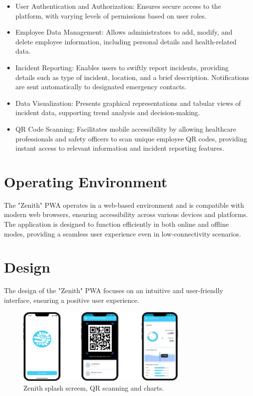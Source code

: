 \documentclass{scrreprt}
\begin{document}
\begin{itemize}
    \item User Authentication and Authorization: Ensures secure access to the platform, with varying levels of permissions based on user roles.
    \item Employee Data Management: Allows administrators to add, modify, and delete employee information, including personal details and health-related data.
    \item Incident Reporting: Enables users to swiftly report incidents, providing details such as type of incident, location, and a brief description. Notifications are sent automatically to designated emergency contacts.
    \item Data Visualization: Presents graphical representations and tabular views of incident data, supporting trend analysis and decision-making.
    \item QR Code Scanning: Facilitates mobile accessibility by allowing healthcare professionals and safety officers to scan unique employee QR codes, providing instant access to relevant information and incident reporting features.
\end{itemize}

\section{Operating Environment}
The "Zenith" PWA operates in a web-based environment and is compatible with modern web browsers, ensuring accessibility across various devices and platforms. The application is designed to function efficiently in both online and offline modes, providing a seamless user experience even in low-connectivity scenarios.

\section{Design}
The design of the "Zenith" PWA focuses on an intuitive and user-friendly interface, ensuring a positive user experience. 

    \begin{figure}[h!]
      \centering
      \includegraphics[width=0.75\textwidth]{mockups1.png}
      \caption{Zenith splash screem, QR scanning and charts.}
    \end{figure}
\end{document}
